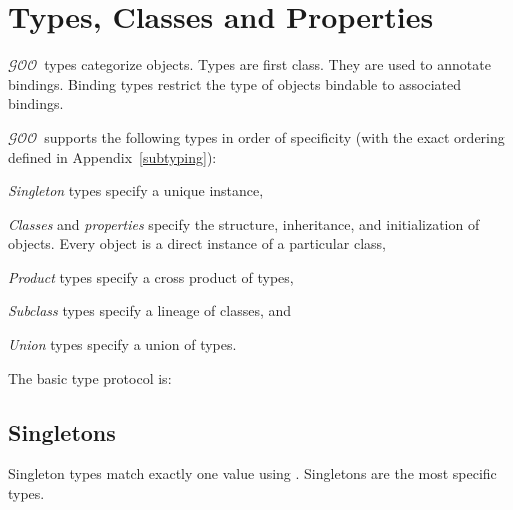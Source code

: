 \documentclass[twoside,twocolumn,9pt]{extarticle}
\newcommand{\goo}{$\mathcal{GOO}$}
\begin{document}
\section{Types, Classes and Properties}

\goo\ types categorize objects.  Types are first class.  They are used
to annotate bindings.  Binding types restrict the type of objects
bindable to associated bindings.

\goo\ supports the following types in order of specificity 
(with the exact ordering defined in Appendix~\ref{subtyping}):
\begin{packeditemize}
\item {\it Singleton} types specify a unique instance,
\item {\it Classes} and {\it properties} specify the structure, 
inheritance, and
initialization of objects.  Every object is a direct instance of a
particular class,
\item {\it Product} types specify a cross product of types, 
\item {\it Subclass} types specify a lineage of classes, and
\item {\it Union} types specify a union of types.
\end{packeditemize}

The basic type protocol is:

\begin{defs}
% 
% 
\end{defs}

\subsection{Singletons}

Singleton types match exactly one value using \kode{==}.  Singletons are 
the most specific types.
\end{document}
